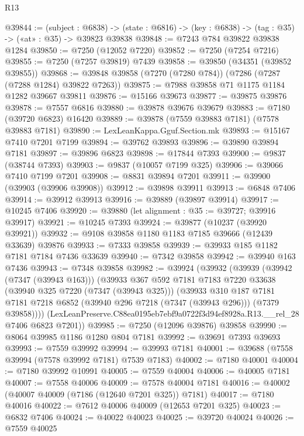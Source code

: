 \begin{lexlean}{R13}
\begin{coremodule}
@39844 := (subject : @6838) ->
  (state : @6816) -> (key : @6838) -> (tag : @35) -> («at» : @35) -> @39823 @39838
@39848 := @7243 @784 @39822 @39838 @1284
@39850 := @7250 (@12052 @7220)
@39852 := @7250 (@7254 @7216)
@39855 := @7250 (@7257 @39819) @7439
@39858 := @39850 (@34351 (@39852 @39855))
@39868 := @39848 @39858 (@7270 (@7280 @784)) (@7286 (@7287 (@7288 @1284) @39822 @7263))
@39875 := @7988 @39858 @71 @1175 @1184 @1282 @39667 @39811
@39876 := @15166 @39673
@39877 := @39875 @39876
@39878 := @7557 @6816
@39880 := @39878 @39676 @39679
@39883 := @7180 (@39720 @6823) @16420
@39889 := @39878 (@7559 @39883 @7181) (@7578 @39883 @7181)
@39890 := LexLeanKappa.Gguf.Section.mk
@39893 := @15167 @7410 @7201 @7199
@39894 := @39762 @39893
@39896 := @39890 @39894 @7181
@39897 := @39896 @6823
@39898 := @17844 @7393
@39900 := @9837 (@38744 @7393)
@39903 := @9837 (@10057 @7199 @325)
@39906 := @39066 @7410 @7199 @7201
@39908 := @8831 @39894 @7201
@39911 := @39900 (@39903 (@39906 @39908))
@39912 := @39898 @39911
@39913 := @6848 @7406
@39914 := @39912 @39913
@39916 := @39889 (@39897 @39914)
@39917 := @10245 @7406
@39920 := @39880 (let alignment : @35 := @39727; @39916 @39917)
@39921 := @10245 @7393
@39924 := @39877 (@10237 (@39920 @39921))
@39932 := @9108 @39858 @1180 @1183 @7185 @39666 (@12439 @33639) @39876
@39933 := @7333 @39858
@39939 := @39933 @185 @1182 @7181 @7184 @7436 @33639
@39940 := @7342 @39858
@39942 := @39940 @163 @7436
@39943 := @7348 @39858
@39982 := @39924
    (@39932
      (@39939
        (@39942 (@7347 (@39943 @163)))
        (@39933
          @367
          @592
          @7181
          @7183
          @7220
          @33638
          (@39940 @325 @7220 (@7347 (@39943 @325)))
          (@39933
            @310
            @187
            @7181
            @7181
            @7218
            @6852
            (@39940 @296 @7218 (@7347 (@39943 @296)))
            (@7379 @39858))))
      (LexLeanPreserve.C88ea0195eb7ebf9a0722f3d94ef8928a.R13.__rel_28 @7406 @6823 @7201))
@39985 := @7250 (@12096 @39876) @39858
@39990 := @8064 @39985 @1186 @1280 @804 @7181
@39992 := @39691 @7393 @39693
@39993 := @7559 @39992
@39994 := @39993 @7181
@40001 := @39688 (@7558 @39994 (@7578 @39992 @7181) @7539 @7183)
@40002 := @7180 @40001
@40004 := @7180 @39992 @10991
@40005 := @7559 @40004
@40006 := @40005 @7181
@40007 := @7558 @40006
@40009 := @7578 @40004 @7181
@40016 := @40002 (@40007 @40009 (@7186 (@12640 @7201 @325)) @7181)
@40017 := @7180 @40016
@40022 := @7612 @40006 @40009 (@12653 @7201 @325)
@40023 := @6832 @7406
@40024 := @40022 @40023
@40025 := @39720 @40024
@40026 := @7559 @40025

\end{coremodule}
\end{lexlean}
